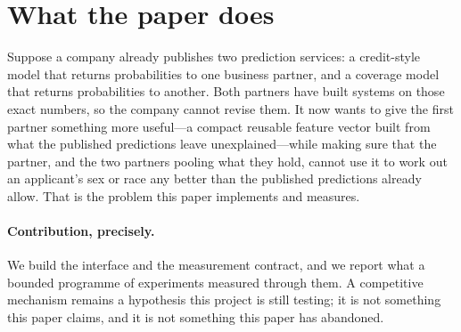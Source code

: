 \documentclass[10pt]{article}
\begin{document}
\begin{abstract}
significantly better, \emph{every} one of the $18$ on residence utility and none on a sensitive
endpoint. Its one positive---that coalition conditioning beats a local control---holds robustly only
against the \emph{weak} local control; against the strength-matched control it survives at the
family-adjusted level on one endpoint at one width and does not survive the simultaneous correction
its negative results are held to. Lower recovery together with lower retained capability is a
trade-off, not dominance. We therefore report an empirical and problem-formulation contribution and
four negative method results; we list every claim of our own that this revision withdraws or narrows;
and we review a fifth, two-track programme \emph{before} any of its outcomes exist, with its cells
left empty.
\end{abstract}

\section{What the paper does}
\label{sec:contribution}

Suppose a company already publishes two prediction services: a credit-style model that returns
probabilities to one business partner, and a coverage model that returns probabilities to another.
Both partners have built systems on those exact numbers, so the company cannot revise them. It now
wants to give the first partner something more useful---a compact reusable feature vector built from
what the published predictions leave unexplained---while making sure that the partner, and the two
partners pooling what they hold, cannot use it to work out an applicant's sex or race any better than
the published predictions already allow. That is the problem this paper implements and measures.

\paragraph{Contribution, precisely.} We build the interface and the measurement contract, and we
report what a bounded programme of experiments measured through them. A competitive mechanism
remains a hypothesis this project is still testing; it is not something this paper claims, and it is
not something this paper has abandoned.
\end{document}
